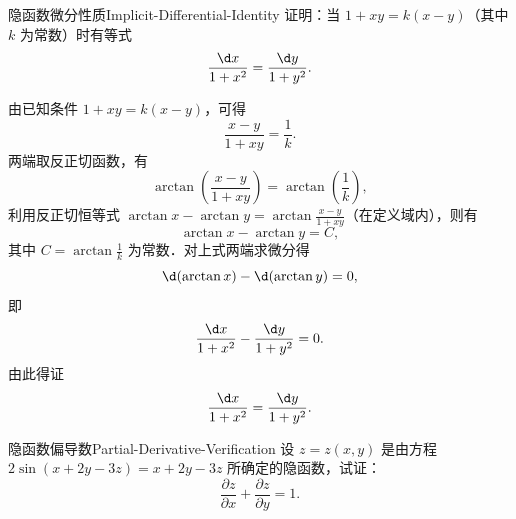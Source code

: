 \begin{problem}{隐函数微分性质}{Implicit-Differential-Identity}
    证明：当 $1 + xy = k(x - y)$（其中 $k$ 为常数）时有等式
    \begin{equation}
        \frac{\d x}{1 + x^2} = \frac{\d y}{1 + y^2}.
    \end{equation}
\end{problem}

\begin{myproof}
    由已知条件 $1 + xy = k(x - y)$，可得
    \begin{equation}
        \frac{x - y}{1 + xy} = \frac{1}{k}.
    \end{equation}
    两端取反正切函数，有
    \begin{equation}
        \arctan \left( \frac{x - y}{1 + xy} \right) = \arctan \left( \frac{1}{k} \right),
    \end{equation}
    利用反正切恒等式 $\arctan x - \arctan y = \arctan \frac{x - y}{1 + xy}$（在定义域内），则有
    \begin{equation}
        \arctan x - \arctan y = C,
    \end{equation}
    其中 $C = \arctan \frac{1}{k}$ 为常数．对上式两端求微分得
    \begin{equation}
        \d (\arctan x) - \d (\arctan y) = 0,
    \end{equation}
    即
    \begin{equation}
        \frac{\d x}{1 + x^2} - \frac{\d y}{1 + y^2} = 0.
    \end{equation}
    由此得证
    \begin{equation}
        \frac{\d x}{1 + x^2} = \frac{\d y}{1 + y^2}.
    \end{equation}
\end{myproof}


\begin{problem}{隐函数偏导数}{Partial-Derivative-Verification}
    设 $z = z(x, y)$ 是由方程 $2\sin(x + 2y - 3z) = x + 2y - 3z$ 所确定的隐函数，试证：
    \begin{equation}
        \frac{\partial z}{\partial x} + \frac{\partial z}{\partial y} = 1.
    \end{equation}
\end{problem}

